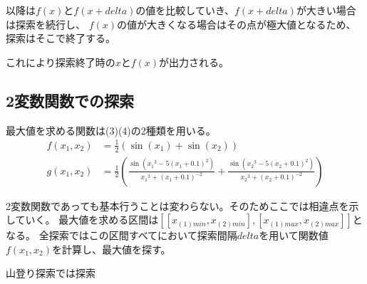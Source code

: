 \documentclass[a4paper,11pt,dvipdfmx]{jsarticle}
\begin{document}
以降は$f(x)$と$f(x+delta)$の値を比較していき、$f(x+delta)$が大きい場合は探索を続行し、
$f(x)$の値が大きくなる場合はその点が極大値となるため、探索はそこで終了する。

これにより探索終了時の$x$と$f(x)$が出力される。

\subsection{2変数関数での探索}
最大値を求める関数は(3)(4)の2種類を用いる。
\begin{align}
    f(x_1,x_2) &= \frac{1}{2} (\sin(x_1) + \sin(x_2))\\
    g(x_1,x_2) &= \frac{1}{2} \left( \frac{\sin({x_1}^3-5(x_1+0.1)^2)}{{x_1}^3+(x_1+0.1)^{-2}} + \frac{\sin({x_2}^3-5(x_2+0.1)^2)}{{x_2}^3+(x_2+0.1)^{-2}} \right)
\end{align}

2変数関数であっても基本行うことは変わらない。そのためここでは相違点を示していく。
最大値を求める区間は$[[x_{(1)min},x_{(2)min}],[x_{(1)max},x_{(2)max}]]$となる。
全探索ではこの区間すべてにおいて探索間隔$delta$を用いて関数値$f(x_1,x_2)$を計算し、最大値を探す。

山登り探索では探索






\end{document}
